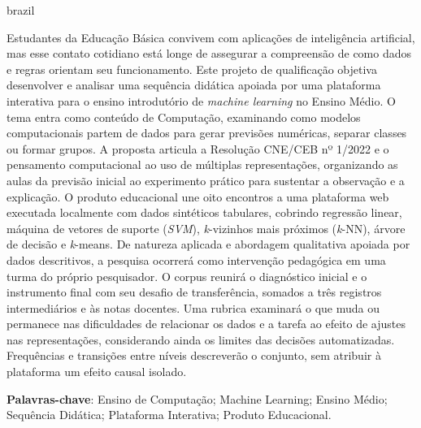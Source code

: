 \setlength{\absparsep}{18pt} 

\begin{resumo}[Resumo]
 \begin{otherlanguage*}{brazil}
   
   \vspace{\onelineskip}
   \noindent 
   
Estudantes da Educação Básica convivem com aplicações de inteligência artificial, mas esse contato cotidiano está longe de assegurar a compreensão de como dados e regras orientam seu funcionamento. Este projeto de qualificação objetiva desenvolver e analisar uma sequência didática apoiada por uma plataforma interativa para o ensino introdutório de \textit{machine learning} no Ensino Médio. O tema entra como conteúdo de Computação, examinando como modelos computacionais partem de dados para gerar previsões numéricas, separar classes ou formar grupos. A proposta articula a Resolução CNE/CEB nº 1/2022 e o pensamento computacional ao uso de múltiplas representações, organizando as aulas da previsão inicial ao experimento prático para sustentar a observação e a explicação. O produto educacional une oito encontros a uma plataforma web executada localmente com dados sintéticos tabulares, cobrindo regressão linear, máquina de vetores de suporte (\textit{SVM}), \textit{k}-vizinhos mais próximos (\textit{k}-NN), árvore de decisão e \textit{k}-means. De natureza aplicada e abordagem qualitativa apoiada por dados descritivos, a pesquisa ocorrerá como intervenção pedagógica em uma turma do próprio pesquisador. O corpus reunirá o diagnóstico inicial e o instrumento final com seu desafio de transferência, somados a três registros intermediários e às notas docentes. Uma rubrica examinará o que muda ou permanece nas dificuldades de relacionar os dados e a tarefa ao efeito de ajustes nas representações, considerando ainda os limites das decisões automatizadas. Frequências e transições entre níveis descreverão o conjunto, sem atribuir à plataforma um efeito causal isolado.
   
   \textbf{Palavras-chave}: Ensino de Computação; Machine Learning; Ensino Médio; Sequência Didática; Plataforma Interativa; Produto Educacional.

 \end{otherlanguage*}
\end{resumo}

